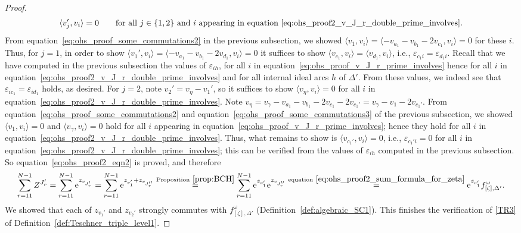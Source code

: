 \documentclass[10pt,a4paper]{amsart}
\numberwithin{equation}{section}
\theoremstyle{definition}
\begin{document}
\begin{proof}
\begin{align*}
\langle v_j', v_i\rangle=0 \qquad \mbox{for all $j\in \{1,2\}$ and $i$ appearing in equation~\eqref{eq:ohs_proof2_v_J_r_double_prime_involves}}.
\end{align*}
From equation~\eqref{eq:ohs_proof_some_commutations2} in the previous subsection, we showed $\langle v_1, v_i \rangle = \langle - v_{a_1} - v_{b_1} - 2v_{c_1}, v_i\rangle =0$ for these $i$. Thus, for $j=1$, in order to show $\langle v_1', v_i \rangle = \langle - v_{a_1} - v_{b_1} - 2v_{d_1}, v_i \rangle =0$ it suffices to show $\langle v_{c_1}, v_i \rangle = \langle v_{d_1}, v_i\rangle$, i.e., $\varepsilon_{c_1 i} = \varepsilon_{d_1 i}$. Recall that we have computed in the previous subsection the values of $\varepsilon_{ih}$, for all $i$ in equation~\eqref{eq:ohs_proof_v_J_r_prime_involves} hence for all $i$ in equation~\eqref{eq:ohs_proof2_v_J_r_double_prime_involves} and for all internal ideal arcs $h$ of $\Delta'$. From these values, we indeed see that $\varepsilon_{i c_1} = \varepsilon_{i d_1}$ holds, as desired. For $j=2$, note $v_2' = v_\eta - v_1'$, so it suffices to show $\langle v_\eta, v_i \rangle=0$ for all $i$ in equation~\eqref{eq:ohs_proof2_v_J_r_double_prime_involves}. Note $v_\eta = v_\gamma - v_{a_1} - v_{b_1} - 2v_{c_1} - 2v_{c_1'} = v_\gamma - v_1 - 2v_{c_1'}$. From equation~\eqref{eq:ohs_proof_some_commutations2} and equation~\eqref{eq:ohs_proof_some_commutations3} of the previous subsection, we showed $\langle v_1, v_i \rangle=0$ and $\langle v_\gamma, v_i \rangle=0$ hold for all $i$ appearing in equation~\eqref{eq:ohs_proof_v_J_r_prime_involves}; hence they hold for all $i$ in equation~\eqref{eq:ohs_proof2_v_J_r_double_prime_involves}. Thus, what remains to show is $\langle v_{c_1'}, v_i \rangle =0$, i.e., $\varepsilon_{c_1' i}=0$ for all $i$ in equation~\eqref{eq:ohs_proof2_v_J_r_double_prime_involves}; this can be verified from the values of $\varepsilon_{ih}$ computed in the previous subsection. So equation~\eqref{eq:ohs_proof2_eqn2} is proved, and therefore
\begin{align*}
\sum_{r=11}^{N-1} Z^{J_r'} = \sum_{r=11}^{N-1} {\rm e}^{z_{v_{J_r'}}}
= \sum_{r=11}^{N-1} {\rm e}^{z_{v_1'} + z_{v_{J_r''}}}
 \stackrel{{\rm Proposition}~\ref{prop:BCH}}{=}
\sum_{r=11}^{N-1} {\rm e}^{z_{v_1'}} {\rm e}^{z_{v_{J_r''}}}
 \stackrel{{\rm equation}~\eqref{eq:ohs_proof2_sum_formula_for_zeta}}{=}
{\rm e}^{z_{v_1'}} f^\omega_{[\zeta],\Delta'}.
\end{align*}
We showed that each of $z_{v_1'}$ and $z_{v_2'}$ strongly commutes with $f^\omega_{[\zeta],\Delta'}$ (Definition~\ref{def:algebraic_SC1}). This finishes the verification of \ref{TR3} of Definition~\ref{def:Teschner_triple_level1}.

\end{proof}
\end{document}
